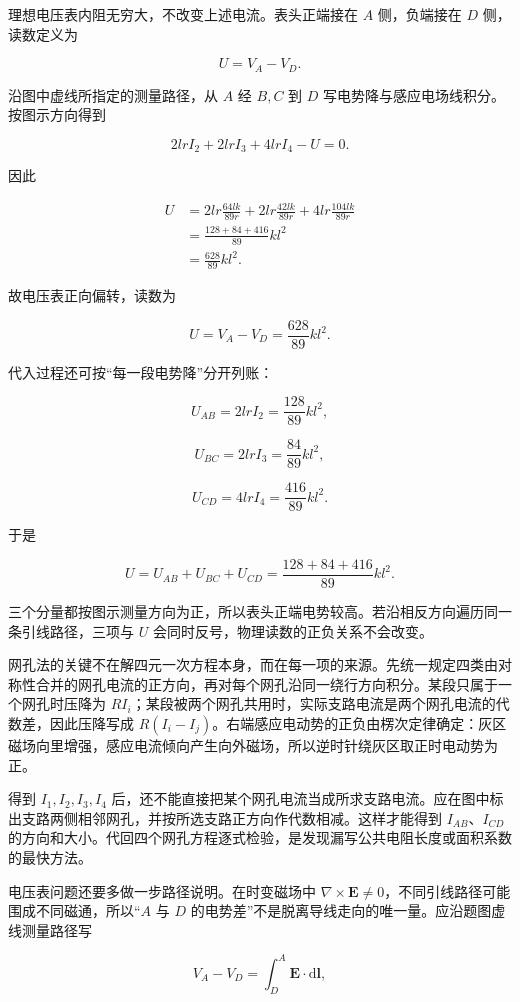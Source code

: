 \documentclass[12pt,a4paper,UTF8]{ctexart}
\begin{document}
理想电压表内阻无穷大，不改变上述电流。表头正端接在 \(A\) 侧，负端接在
\(D\) 侧，读数定义为

\[U=V_A-V_D.\]

沿图中虚线所指定的测量路径，从 \(A\) 经 \(B,C\) 到 \(D\)
写电势降与感应电场线积分。按图示方向得到

\[2lrI_2+2lrI_3+4lrI_4-U=0. \tag{10}\]

因此

\[\begin{aligned}
U
&=2lr\frac{64lk}{89r}
+2lr\frac{42lk}{89r}
+4lr\frac{104lk}{89r}\\
&=\frac{128+84+416}{89}kl^2\\
&=\frac{628}{89}kl^2.
\end{aligned}\]

故电压表正向偏转，读数为

\[\boxed{U=V_A-V_D=\frac{628}{89}kl^2}. \tag{11}\]

代入过程还可按``每一段电势降''分开列账：

\[U_{AB}=2lrI_2=\frac{128}{89}kl^2,\]

\[U_{BC}=2lrI_3=\frac{84}{89}kl^2,\]

\[U_{CD}=4lrI_4=\frac{416}{89}kl^2.\]

于是

\[U=U_{AB}+U_{BC}+U_{CD}
=\frac{128+84+416}{89}kl^2.\]

三个分量都按图示测量方向为正，所以表头正端电势较高。若沿相反方向遍历同一条引线路径，三项与
\(U\) 会同时反号，物理读数的正负关系不会改变。

网孔法的关键不在解四元一次方程本身，而在每一项的来源。先统一规定四类由对称性合并的网孔电流的正方向，再对每个网孔沿同一绕行方向积分。某段只属于一个网孔时压降为
\(RI_i\)；某段被两个网孔共用时，实际支路电流是两个网孔电流的代数差，因此压降写成
\(R(I_i-I_j)\)。右端感应电动势的正负由楞次定律确定：灰区磁场向里增强，感应电流倾向产生向外磁场，所以逆时针绕灰区取正时电动势为正。

得到 \(I_1,I_2,I_3,I_4\)
后，还不能直接把某个网孔电流当成所求支路电流。应在图中标出支路两侧相邻网孔，并按所选支路正方向作代数相减。这样才能得到
\(I_{AB}\)、\(I_{CD}\)
的方向和大小。代回四个网孔方程逐式检验，是发现漏写公共电阻长度或面积系数的最快方法。

电压表问题还要多做一步路径说明。在时变磁场中
\(\nabla\times\boldsymbol E\ne0\)，不同引线路径可能围成不同磁通，所以``\(A\)
与 \(D\) 的电势差''不是脱离导线走向的唯一量。应沿题图虚线测量路径写

\[V_A-V_D=\int_D^A\boldsymbol E\cdot\mathrm d\boldsymbol l,\]
\end{document}
